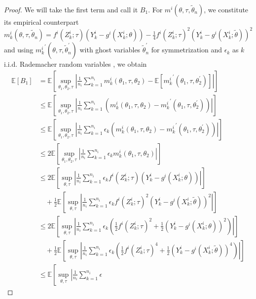 \documentclass{article}
\theoremstyle{definition}
\begin{document}
\begin{proof}
    We will take the first term and call it $B_1$. For $m^i(\theta,\tau,\tilde{\theta}_n)$, we constitute its empirical counterpart $m^i_k(\theta,\tau,\tilde{\theta}_n)=f^i(Z^i_k;\tau)(Y^i_k-g^i(X_k^i;\theta))-\frac{1}{4}f^i(Z^i_k;\tau)^2(Y^i_k-g^i(X_k^i;\tilde{\theta}))^2$ and using ${m^i_k}^{\prime}(\theta,\tau,{\tilde{\theta}}^{\prime}_n)$ with ghost variables $\tilde{\theta}^{\prime}_n$ for symmetrization and $\epsilon_k$ as $k$ i.i.d. Rademacher random variables , we obtain
    \begin{align*}
        \mathbb{E}[B_1]&=\mathbb{E}\left[\sup_{\theta_1,\theta_2, \tau} \left\vert\frac{1}{n_i}\sum_{k=1}^{n_i}m^i_k(\theta_1,\tau,\theta_{2})-\mathbb{E}\left[{m^i_k}^{\prime}(\theta_1,\tau,{{\theta}}^{\prime}_2)\right]\right\vert\right]\\
        &\le\mathbb{E}\left[\sup_{\theta_1,\theta_2, \tau} \left\vert\frac{1}{n_i}\sum_{k=1}^{n_i}\left(m^i_k(\theta_1,\tau,\theta_{2})-{m^i_k}^{\prime}(\theta_1,\tau,{{\theta}}^{\prime}_2)\right)\right\vert\right]\\
        &\le\mathbb{E}\left[\sup_{\theta_1,\theta_2, \tau} \left\vert\frac{1}{n_i}\sum_{k=1}^{n_i}\epsilon
        _k \left(m^i_k(\theta_1,\tau,\theta_{2})-{m^i_k}^{\prime}(\theta_1,\tau,{{\theta}}^{\prime}_2)\right)\right\vert\right]\\
        &\le2\mathbb{E}\left[\sup_{\theta_1,\theta_2, \tau} \left\vert\frac{1}{n_i}\sum_{k=1}^{n_i}\epsilon
        _k m^i_k(\theta_1,\tau,\theta_{2})\right\vert\right]\\
         &\le2\mathbb{E}\left[\sup_{\theta,\tau}\left\vert\frac{1}{n_i}\sum_{k=1}^{n_i}\epsilon
        _k f^i(Z^i_k;\tau)(Y^i_k-g^i(X_k^i;\theta))\right\vert\right]\\
        &\quad +\frac{1}{2}\mathbb{E}\left[\sup_{\theta,\tau} \left\vert \frac{1}{n_i}\sum_{k=1}^{n_i}\epsilon
        _k  f^i(Z^i_k;\tau)^2(Y^i_k-g^i(X_k^i;\tilde{\theta}))^2\right\vert\right]\\
        &\le2\mathbb{E}\left[\sup_{\theta,\tau}\left\vert\frac{1}{n_i}\sum_{k=1}^{n_i}\epsilon
        _k \left(\frac{1}{2}f^i(Z^i_k;\tau)^2+\frac{1}{2}(Y^i_k-g^i(X_k^i;\theta))^2\right)\right\vert\right]\\
        &\quad +\frac{1}{2}\mathbb{E}\left[\sup_{\theta,\tau} \left\vert \frac{1}{n_i}\sum_{k=1}^{n_i}\epsilon
        _k \left(\frac{1}{2} f^i(Z^i_k;\tau)^4+\frac{1}{2}(Y^i_k-g^i(X_k^i;\tilde{\theta}))^4\right)\right\vert\right]\\
        &\le\mathbb{E}\left[\sup_{\theta,\tau} \left\vert\frac{1}{n_i}\sum_{k=1}^{n_i}\epsilon

\end{align*}
\end{proof}
\end{document}

